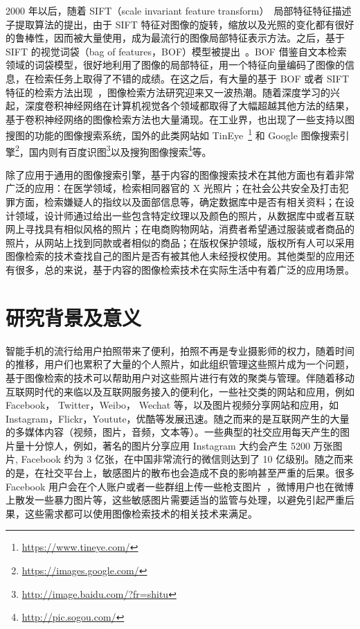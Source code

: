 2000 年以后，随着 SIFT（scale invariant feature transform）~\cite{Lowe2004DistinctiveIF}局部特征特征描述子提取算法的提出，由于 SIFT 特征对图像的旋转，缩放以及光照的变化都有很好的鲁棒性，因而被大量使用，成为最流行的图像局部特征表示方法。之后，基于 SIFT 的视觉词袋（bag of features，BOF）模型被提出~\cite{Sivic2003VideoGA}。BOF 借鉴自文本检索领域的词袋模型，很好地利用了图像的局部特征，用一个特征向量编码了图像的信息，在检索任务上取得了不错的成绩。在这之后，有大量的基于 BOF 或者 SIFT 特征的检索方法出现~\cite{Philbin2008LostIQ,Philbin2007ObjectRW,Mikulk2010LearningAF,Arandjelovic2012ThreeTE,Chum2007TotalRA}，图像检索方法研究迎来又一波热潮。随着深度学习的兴起，深度卷积神经网络在计算机视觉各个领域都取得了大幅超越其他方法的结果，基于卷积神经网络的图像检索方法也大量涌现。在工业界，也出现了一些支持以图搜图的功能的图像搜索系统，国外的此类网站如 TinEye~\footnote{\url{https://www.tineye.com/}} 和 Google 图像搜索引擎\footnote{\url{https://images.google.com/}}，国内则有百度识图\footnote{\url{http://image.baidu.com/?fr=shitu}}以及搜狗图像搜索\footnote{\url{http://pic.sogou.com/}}等。

除了应用于通用的图像搜索引擎，基于内容的图像搜索技术在其他方面也有着非常广泛的应用：在医学领域，检索相同器官的 X 光照片；在社会公共安全及打击犯罪方面，检索嫌疑人的指纹以及面部信息等，确定数据库中是否有相关资料；在设计领域，设计师通过给出一些包含特定纹理以及颜色的照片，从数据库中或者互联网上寻找具有相似风格的照片；在电商购物网站，消费者希望通过服装或者商品的照片，从网站上找到同款或者相似的商品；在版权保护领域，版权所有人可以采用图像检索的技术查找自己的图片是否有被其他人未经授权使用。其他类型的应用还有很多，总的来说，基于内容的图像检索技术在实际生活中有着广泛的应用场景。

\section{研究背景及意义}
智能手机的流行给用户拍照带来了便利，拍照不再是专业摄影师的权力，随着时间的推移，用户们也累积了大量的个人照片，如此组织管理这些照片成为一个问题，基于图像检索的技术可以帮助用户对这些照片进行有效的聚类与管理。伴随着移动互联网时代的来临以及互联网服务接入的便利化，一些社交类的网站和应用，例如 Facebook， Twitter，Weibo， Wechat 等，以及图片视频分享网站和应用，如 Instagram，Flickr，Youtute，优酷等发展迅速。随之而来的是互联网产生的大量的多媒体内容（视频，图片，音频，文本等）。一些典型的社交应用每天产生的图片量十分惊人，例如，著名的图片分享应用 Instagram 大约会产生 5200 万张图片, Facebook 约为 3 亿张，在中国非常流行的微信则达到了 10 亿级别。随之而来的是，在社交平台上，敏感图片的散布也会造成不良的影响甚至严重的后果。很多 Facebook 用户会在个人账户或者一些群组上传一些枪支图片~\cite{Drange2016}，微博用户也在微博上散发一些暴力图片等，这些敏感图片需要适当的监管与处理，以避免引起严重后果，这些需求都可以使用图像检索技术的相关技术来满足。

